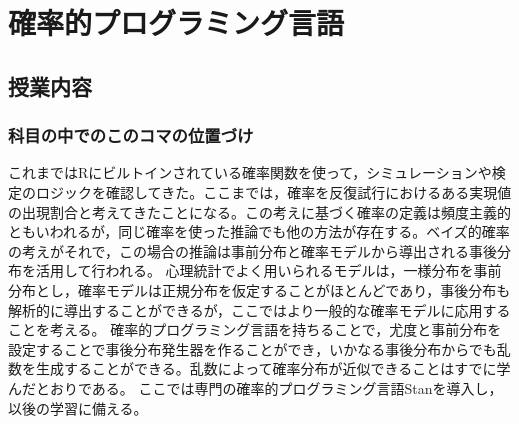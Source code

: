\section{確率的プログラミング言語}
\subsection{授業内容}
\subsubsection{科目の中でのこのコマの位置づけ}
これまではRにビルトインされている確率関数を使って，シミュレーションや検定のロジックを確認してきた。ここまでは，確率を反復試行におけるある実現値の出現割合と考えてきたことになる。この考えに基づく確率の定義は頻度主義的ともいわれるが，同じ確率を使った推論でも他の方法が存在する。ベイズ的確率の考えがそれで，この場合の推論は事前分布と確率モデルから導出される事後分布を活用して行われる。
心理統計でよく用いられるモデルは，一様分布を事前分布とし，確率モデルは正規分布を仮定することがほとんどであり，事後分布も解析的に導出することができるが，ここではより一般的な確率モデルに応用することを考える。
確率的プログラミング言語を持ちることで，尤度と事前分布を設定することで事後分布発生器を作ることができ，いかなる事後分布からでも乱数を生成することができる。乱数によって確率分布が近似できることはすでに学んだとおりである。
ここでは専門の確率的プログラミング言語Stanを導入し，以後の学習に備える。

